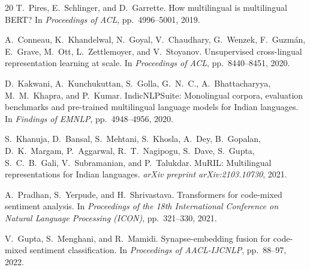 \begin{thebibliography}{20}
T.\ Pires, E.\ Schlinger, and D.\ Garrette.
\newblock How multilingual is multilingual BERT?
\newblock In \textit{Proceedings of ACL}, pp.\ 4996--5001, 2019.

A.\ Conneau, K.\ Khandelwal, N.\ Goyal, V.\ Chaudhary, G.\ Wenzek, F.\ Guzmán, E.\ Grave, M.\ Ott, L.\ Zettlemoyer, and V.\ Stoyanov.
\newblock Unsupervised cross-lingual representation learning at scale.
\newblock In \textit{Proceedings of ACL}, pp.\ 8440--8451, 2020.

D.\ Kakwani, A.\ Kunchukuttan, S.\ Golla, G.\ N.\ C., A.\ Bhattacharyya, M.\ M.\ Khapra, and P.\ Kumar.
\newblock IndicNLPSuite: Monolingual corpora, evaluation benchmarks and pre-trained multilingual language models for Indian languages.
\newblock In \textit{Findings of EMNLP}, pp.\ 4948--4956, 2020.

S.\ Khanuja, D.\ Bansal, S.\ Mehtani, S.\ Khosla, A.\ Dey, B.\ Gopalan, D.\ K.\ Margam, P.\ Aggarwal, R.\ T.\ Nagipogu, S.\ Dave, S.\ Gupta, S.\ C.\ B.\ Gali, V.\ Subramanian, and P.\ Talukdar.
\newblock MuRIL: Multilingual representations for Indian languages.
\newblock \textit{arXiv preprint arXiv:2103.10730}, 2021.

A.\ Pradhan, S.\ Yerpude, and H.\ Shrivastava.
\newblock Transformers for code-mixed sentiment analysis.
\newblock In \textit{Proceedings of the 18th International Conference on Natural Language Processing (ICON)}, pp.\ 321--330, 2021.

V.\ Gupta, S.\ Menghani, and R.\ Mamidi.
\newblock Synapse-embedding fusion for code-mixed sentiment classification.
\newblock In \textit{Proceedings of AACL-IJCNLP}, pp.\ 88--97, 2022.

\end{thebibliography}
